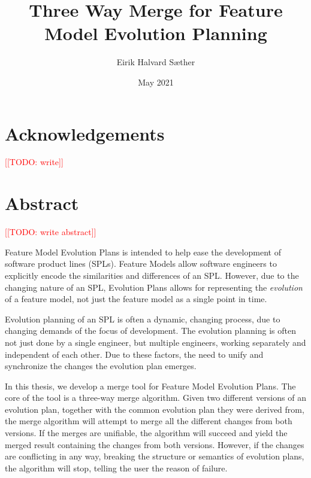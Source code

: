 \documentclass[a4paper,english]{ifimaster}
\title{Three Way Merge for Feature Model Evolution Planning}
\date{May 2021}
\author{Eirik Halvard Sæther}
\newcommand{\todo}[1]{\textcolor{red}{[[TODO: #1]]}\PackageWarning{TODO:}{#1!}}
\begin{document}
\duoforside[dept={Department of Informatics},
program={Informatics: Programming and Systems Architecture},
long]
\frontmatter{}

\chapter*{Acknowledgements}

\todo{write}





\newpage
\thispagestyle{empty}
\mbox{}
\chapter*{Abstract}

\todo{write abstract}

Feature Model Evolution Plans is intended to help ease the development of software product lines (SPLs). Feature Models allow software engineers to explicitly encode the similarities and differences of an SPL. However, due to the changing nature of an SPL, Evolution Plans allows for representing the \textit{evolution} of a feature model, not just the feature model as a single point in time.

Evolution planning of an SPL is often a dynamic, changing process, due to changing demands of the focus of development. The evolution planning is often not just done by a single engineer, but multiple engineers, working separately and independent of each other. Due to these factors, the need to unify and synchronize the changes the evolution plan emerges.

In this thesis, we develop a merge tool for Feature Model Evolution Plans. The core of the tool is a three-way merge algorithm. Given two different versions of an evolution plan, together with the common evolution plan they were derived from, the merge algorithm will attempt to merge all the different changes from both versions. If the merges are unifiable, the algorithm will succeed and yield the merged result containing the changes from both versions. However, if the changes are conflicting in any way, breaking the structure or semantics of evolution plans, the algorithm will stop, telling the user the reason of failure.
\end{document}
